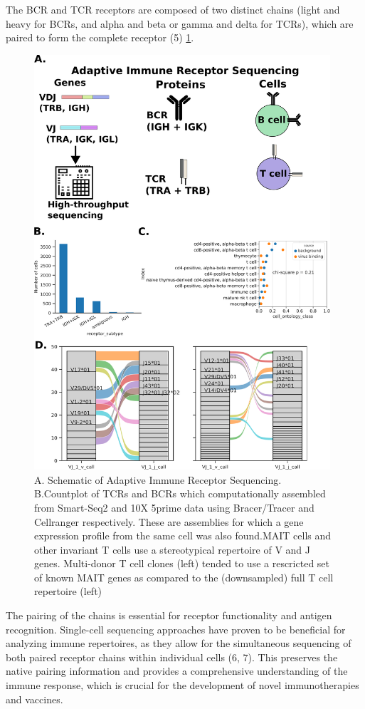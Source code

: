 The BCR and TCR receptors are composed of two distinct chains (light and heavy for BCRs, and alpha and beta or gamma and delta for TCRs), which are paired to form the complete receptor (5) \ref{fig:paper1_airr}. 

\begin{figure}[hbt!]
\centering
\includegraphics[width=11cm, keepaspectratio]{figs/paper1/fig2_tabula_airr.png}
\caption[AIRR-seq for analyzing the T cell Repertoire in Tabula Sapiens]{A. Schematic of Adaptive Immune Receptor Sequencing. B.Countplot of TCRs and BCRs which computationally assembled from Smart-Seq2 and 10X 5prime data using Bracer/Tracer and Cellranger respectively. These are assemblies for which a gene expression profile from the same cell was also found.MAIT cells and other invariant T cells use a stereotypical repertoire of V and J genes. Multi-donor T cell clones (left) tended to use a rescricted set of known MAIT genes as compared to the (downsampled) full T cell repertoire (left)}
\label{fig:paper1_airr}
\end{figure}

The pairing of the chains is essential for receptor functionality and antigen recognition. Single-cell sequencing approaches have proven to be beneficial for analyzing immune repertoires, as they allow for the simultaneous sequencing of both paired receptor chains within individual cells (6, 7). This preserves the native pairing information and provides a comprehensive understanding of the immune response, which is crucial for the development of novel immunotherapies and vaccines.

